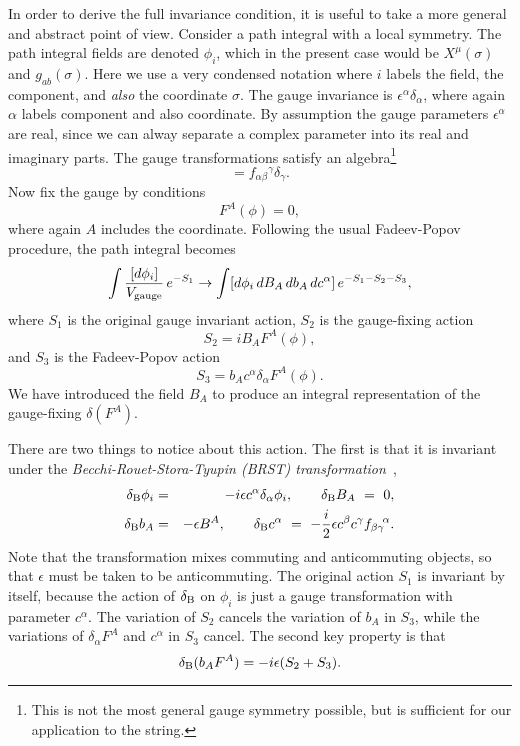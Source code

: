 In order to derive the full invariance condition, it is useful to take
a more general and abstract point of view.  Consider a path integral 
with a local symmetry.  The path integral fields are denoted
$\phi_i$, which in the present case would be $X^\mu(\sigma)$ and
$g_{ab}(\sigma)$.  Here we use a very condensed notation where $i$ labels the
field, the component, and {\it also} the coordinate $\sigma$.  The gauge
invariance is $\epsilon^\alpha \delta_\alpha$, where again $\alpha$ labels
component and also coordinate.  By assumption the gauge parameters
$\epsilon^\alpha$ are real, since we can alway separate a complex parameter
into its real and imaginary parts.
The gauge transformations satisfy an algebra\footnote{This is not the most
general gauge symmetry possible, but is sufficient for our application
to the string.}
\begin{equation}
[\delta_\alpha, \delta_\beta] = f_{\alpha\beta}\!^\gamma \delta_\gamma.
\label{gaalg}
\end{equation}
Now fix the gauge by conditions
\begin{equation}
F^A(\phi) = 0,
\end{equation}
where again $A$ includes the coordinate.  Following the usual Fadeev-Popov
procedure, the path integral becomes
\begin{equation}
\int \frac{[d\phi_i]}{V_{\rm gauge}}\, e^{-S_1} \to 
\int [d\phi_i\, dB_A\, db_A\, dc^\alpha]\, e^{-S_1 - S_2 - S_3},
\end{equation}
where $S_1$ is the original gauge invariant action, $S_2$ is the
gauge-fixing action
\begin{equation}
S_2 = i B_A F^A(\phi),
\end{equation}
and $S_3$ is the Fadeev-Popov action
\begin{equation}
S_3 = b_A c^\alpha \delta_\alpha F^A(\phi).
\end{equation}
We have introduced the field $B_A$ to produce an integral representation of
the gauge-fixing $\delta(F^A)$.

There are two things to notice about this
action.  The first is that it is invariant under the {\it
Becchi-Rouet-Stora-Tyupin (BRST)
transformation}~\cite{BRS},
\begin{eqnarray}
\delta_{\rm B} \phi_i &=& -i\epsilon c^\alpha \delta_\alpha \phi_i,
\qquad
\delta_{\rm B} B_A \ =\ 0,
\nonumber\\
\delta_{\rm B} b_A &=& -\epsilon B^A,
\qquad
\delta_{\rm B} c^\alpha \ =\ -\frac{i}{2}
\epsilon c^\beta c^\gamma f_{\beta\gamma}\!^\alpha. \label{btran}
\end{eqnarray}
Note that the transformation mixes commuting and anticommuting objects,
so that $\epsilon$ must be taken to be anticommuting.
The original action $S_1$ is invariant by itself, because the action
of $\delta_{\rm B}$ on $\phi_i$ is just a gauge transformation with parameter
$c^\alpha$.  The variation of $S_2$ cancels the variation of $b_A$ in
$S_3$, while the variations of $\delta_\alpha F^A$ and $c^\alpha$ in $S_3$
cancel.  The second key property is that
\begin{equation}
\delta_{\rm B} (b_A F^A) = -i\epsilon(S_2 + S_3). \label{s2s3}
\end{equation}


